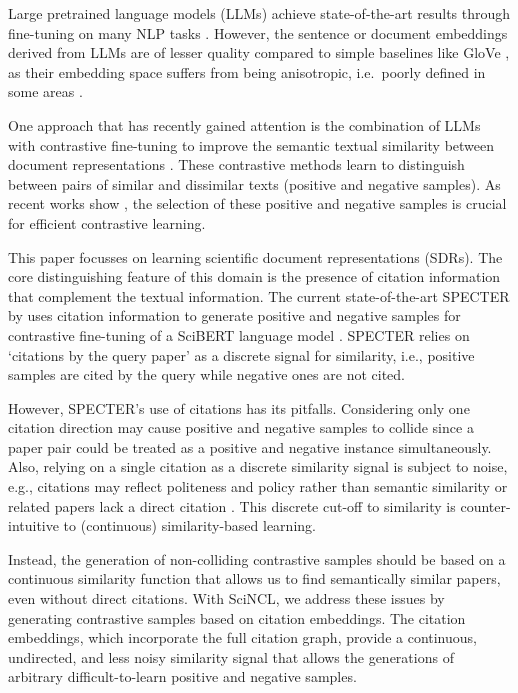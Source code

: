 \documentclass[11pt]{article}
\newcommand{\sys}{SciNCL\xspace} \newcommand{\baselineCount}{10\xspace}
\begin{document}
Large pretrained language models (LLMs) achieve state-of-the-art results through fine-tuning on many NLP tasks \cite{BERTOLOGY}.
However, the sentence or document embeddings derived from LLMs are of lesser quality compared to simple baselines like GloVe \cite{Reimers2019}, as their embedding space suffers from being anisotropic, i.e.\ poorly defined in some areas \cite{Li2020}. 

One approach that has recently gained attention is the combination of LLMs with contrastive fine-tuning to improve the semantic textual similarity between document representations \cite{Wu2020,Gao2021}. These contrastive methods learn to distinguish between pairs of similar and dissimilar texts (positive and negative samples).
As recent works show \cite{MI_views,Rethmeier2021,rethmeier2021dataefficient,TextAugemntations}, the selection of these positive and negative samples is crucial for efficient contrastive learning.


This paper focusses on learning scientific document representations (SDRs).
The core distinguishing feature of this domain is the presence of citation information that complement the textual information.
The current state-of-the-art SPECTER by \citet{Cohan2020} uses citation information to generate positive and negative samples for contrastive fine-tuning of a SciBERT language model \cite{Beltagy2019}. SPECTER relies on `citations by the query paper' as a discrete signal for similarity, i.e., positive samples are cited by the query while negative ones are not cited.

However, SPECTER's use of citations has its pitfalls.
Considering only one citation direction may cause positive and negative samples to collide since a paper pair could be treated as a positive and negative instance simultaneously.
Also, relying on a single citation as a discrete similarity signal is subject to noise, e.g., citations may reflect politeness and policy rather than semantic similarity \cite{Pasternack1969} or related papers lack a direct citation \cite{Gipp2009}. 
This discrete cut-off to similarity is counter-intuitive to (continuous) similarity-based learning.

Instead, the generation of non-colliding contrastive samples should be based on a continuous similarity function that allows us to find semantically similar papers, even without direct citations.
With \sys, we address these issues by generating contrastive samples based on citation embeddings.
The citation embeddings, which incorporate the full citation graph, provide a continuous, undirected, and less noisy similarity signal that allows the generations of arbitrary difficult-to-learn positive and negative samples. 
\end{document}
